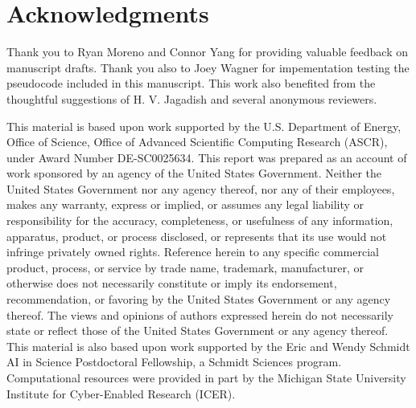 \section*{Acknowledgments}
{\footnotesize

Thank you to Ryan Moreno and Connor Yang for providing valuable feedback on manuscript drafts.
Thank you also to Joey Wagner for impementation testing the pseudocode included in this manuscript.
This work also benefited from the thoughtful suggestions of H. V. Jagadish and several anonymous reviewers.

This material is based upon work supported by the U.S. Department of Energy, Office of Science, Office of Advanced Scientific Computing Research (ASCR), under Award Number DE-SC0025634.
This report was prepared as an account of work sponsored by an agency of the United States Government.
Neither the United States Government nor any agency thereof, nor any of their employees, makes any warranty, express or implied, or assumes any legal liability or responsibility for the accuracy, completeness, or usefulness of any information, apparatus, product, or process disclosed, or represents that its use would not infringe privately owned rights.
Reference herein to any specific commercial product, process, or service by trade name, trademark, manufacturer, or otherwise does not necessarily constitute or imply its endorsement, recommendation, or favoring by the United States Government or any agency thereof.
The views and opinions of authors expressed herein do not necessarily state or reflect those of the United States Government or any agency thereof.
This material is also based upon work supported by the Eric and Wendy Schmidt AI in Science Postdoctoral Fellowship, a Schmidt Sciences program.
Computational resources were provided in part by the Michigan State University Institute for Cyber-Enabled Research (ICER).
}
